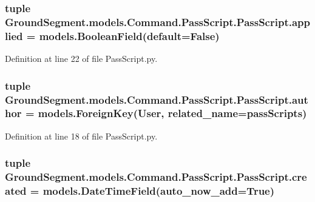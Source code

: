 \subsubsection[{applied}]{\setlength{\rightskip}{0pt plus 5cm}tuple Ground\+Segment.\+models.\+Command.\+Pass\+Script.\+Pass\+Script.\+applied = models.\+Boolean\+Field(default=False)\hspace{0.3cm}{\ttfamily [static]}}\label{class_ground_segment_1_1models_1_1_command_1_1_pass_script_1_1_pass_script_a9e6d8cd987531f5cd7cabfb170a3970b}


Definition at line 22 of file Pass\+Script.\+py.

\hypertarget{class_ground_segment_1_1models_1_1_command_1_1_pass_script_1_1_pass_script_a7166dcd816bbd9ed536d455007c50357}{}
\subsubsection[{author}]{\setlength{\rightskip}{0pt plus 5cm}tuple Ground\+Segment.\+models.\+Command.\+Pass\+Script.\+Pass\+Script.\+author = models.\+Foreign\+Key(User, related\+\_\+name=\textquotesingle{}pass\+Scripts\textquotesingle{})\hspace{0.3cm}{\ttfamily [static]}}\label{class_ground_segment_1_1models_1_1_command_1_1_pass_script_1_1_pass_script_a7166dcd816bbd9ed536d455007c50357}


Definition at line 18 of file Pass\+Script.\+py.

\hypertarget{class_ground_segment_1_1models_1_1_command_1_1_pass_script_1_1_pass_script_ad19259b692f73bfba44c971de2996edd}{}
\subsubsection[{created}]{\setlength{\rightskip}{0pt plus 5cm}tuple Ground\+Segment.\+models.\+Command.\+Pass\+Script.\+Pass\+Script.\+created = models.\+Date\+Time\+Field(auto\+\_\+now\+\_\+add=True)\hspace{0.3cm}{\ttfamily [static]}}\label{class_ground_segment_1_1models_1_1_command_1_1_pass_script_1_1_pass_script_ad19259b692f73bfba44c971de2996edd}


